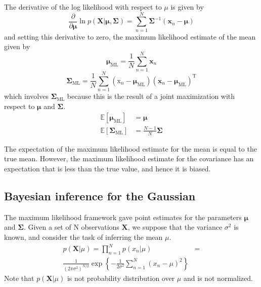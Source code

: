 \documentclass[5p,sort&compress]{elsarticle}
\begin{document}
The derivative of the log likelihood with respect to $\mu$ is given by
\begin{equation}
\frac{\partial}{\partial \boldsymbol{\mu}} \ln p(\mathbf{X} | \boldsymbol{\mu}, \mathbf{\Sigma})=\sum_{n=1}^{N} \boldsymbol{\Sigma}^{-1}\left(\mathbf{x}_{n}-\boldsymbol{\mu}\right)
\end{equation}
and setting this derivative to zero, the maximum likelihood estimate of the mean given by
\begin{equation}
\boldsymbol{\mu}_{\mathrm{ML}}=\frac{1}{N} \sum_{n=1}^{N} \mathbf{x}_{n}
\end{equation}
\begin{equation}
\mathbf{\Sigma}_{\mathrm{ML}}=\frac{1}{N} \sum_{n=1}^{N}\left(\mathrm{x}_{n}-\boldsymbol{\mu}_{\mathrm{ML}}\right)\left(\mathbf{x}_{n}-\boldsymbol{\mu}_{\mathrm{ML}}\right)^{\mathrm{T}}
\end{equation}
which involves $\mathbf{\Sigma}_{\mathrm{ML}}$ because this is the result of a joint maximization with respect to $\boldsymbol{\mu}$ and $\mathbf{\Sigma}$.
\begin{equation}
\begin{aligned} \mathbb{E}\left[\boldsymbol{\mu}_{\mathrm{ML}}\right] &=\boldsymbol{\mu} \\ \mathbb{E}\left[\boldsymbol{\Sigma}_{\mathrm{ML}}\right] &=\frac{N-1}{N} \boldsymbol{\Sigma} \end{aligned}
\end{equation}

The expectation of the maximum likelihood estimate for the mean is equal to the true mean. However, the maximum likelihood estimate for the covariance has an expectation that is less than the true value, and hence it is biased.

\subsection{Bayesian inference for the Gaussian}

The maximum likelihood framework gave point estimates for the parameters $\boldsymbol{\mu}$ and $\mathbf{\Sigma}$. Given a set of N observations $\boldsymbol{X}$, we suppose that the variance $\sigma^2$ is known, and consider the task of inferring the mean $\mu$.
\begin{equation}
\begin{aligned}
p(\mathbf{X} | \mu)=\prod_{n=1}^{N} p\left(x_{n} | \mu\right) & =  \\
\frac{1}{\left(2 \pi \sigma^{2}\right)^{N / 2}} \exp \left\{-\frac{1}{2 \sigma^{2}} \sum_{n=1}^{N}\left(x_{n}-\mu\right)^{2}\right\}
\end{aligned}
\end{equation}
Note that $p(\boldsymbol{X}|\mu)$ is not probability distribution over $\mu$ and is not normalized.
\end{document}
